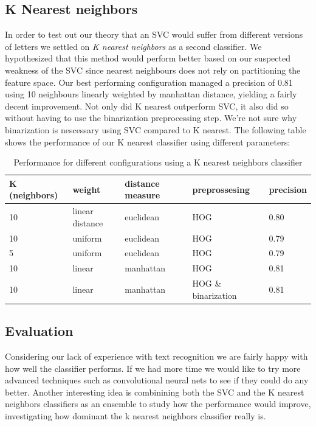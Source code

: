 \documentclass[paper=a4, fontsize=11pt]{scrartcl} %
\numberwithin{equation}{section} %
\numberwithin{figure}{section} %
\numberwithin{table}{section} %
\begin{document}
\subsection{K Nearest neighbors}
In order to test out our theory that an SVC would suffer from
different versions of letters we settled on \textit{K nearest neighbors} as a
second classifier.  We hypothesized that this method would perform
better based on our suspected weakness of the SVC since nearest
neighbours does not rely on partitioning the feature space.  Our best
performing configuration managed a precision of 0.81 using 10
neighbours linearly weighted by manhattan distance, yielding a fairly
decent improvement.  Not only did K nearest outperform SVC, it also
did so without having to use the binarization preprocessing step.
We're not sure why binarization is nescessary using SVC compared to K
nearest.
The following table shows the
performance of our K nearest classifier using different parameters:

\begin{table}[H]
    \centering
    \begin{tabular}{l | l | l | l | l}
        K (neighbors) & weight & distance measure & preprossesing & precision\\ \hline
        10 & linear distance & euclidean & HOG & 0.80\\ \hline
        10 & uniform & euclidean & HOG & 0.79\\ \hline
        5 & uniform & euclidean & HOG & 0.79\\ \hline
        10 & linear & manhattan & HOG & 0.81\\ \hline
        10 & linear & manhattan & HOG \& binarization & 0.81\\
    \end{tabular}
    \caption{Performance for different configurations using a K nearest neighbors classifier}
\end{table}



\subsection{Evaluation}
Considering our lack of experience with text recognition we are fairly happy with how well the classifier performs.
If we had more time we would like to try more advanced techniques such as convolutional neural nets to see if they could do any better.
Another interesting idea is combinining both the SVC and the K nearest neighbors classifiers as an ensemble to study how the performance would improve, 
investigating how dominant the k nearest neighbors classifier really is.
\end{document}
